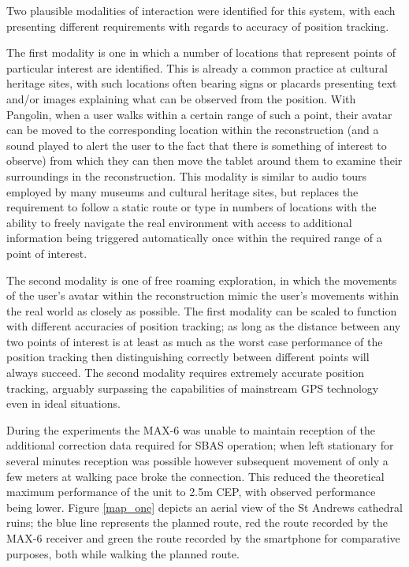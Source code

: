 Two plausible modalities of interaction were identified for this system, with each presenting different requirements with regards to accuracy of position tracking.

The first modality is one in which a number of locations that represent points of particular interest are identified. This is already a common practice at cultural heritage sites, with such locations often bearing signs or placards presenting text and/or images explaining what can be observed from the position. With Pangolin, when a user walks within a certain range of such a point, their avatar can be moved to the corresponding location within the reconstruction (and a sound played to alert the user to the fact that there is something of interest to observe) from which they can then move the tablet around them to examine their surroundings in the reconstruction. This modality is similar to audio tours employed by many museums and cultural heritage sites, but replaces the requirement to follow a static route or type in numbers of locations with the ability to freely navigate the real environment with access to additional information being triggered automatically once within the required range of a point of interest.

The second modality is one of free roaming exploration, in which the movements of the user's avatar within the reconstruction mimic the user's movements within the real world as closely as possible.
The first modality can be scaled to function with different accuracies of position tracking; as long as the distance between any two points of interest is at least as much as the worst case performance of the position tracking then distinguishing correctly between different points will always succeed. The second modality requires extremely accurate position tracking, arguably surpassing the capabilities of mainstream GPS technology even in ideal situations.

During the experiments the MAX-6 was unable to maintain reception of the additional correction data required for SBAS operation; when left stationary for several minutes reception was possible however subsequent movement of only a few meters at walking pace broke the connection. This reduced the theoretical maximum performance of the unit to 2.5m CEP, with observed performance being lower. Figure \ref{map_one} depicts an aerial view of the St Andrews cathedral ruins; the blue line represents the planned route, red the route recorded by the MAX-6 receiver and green the route recorded by the smartphone for comparative purposes, both while walking the planned route.

